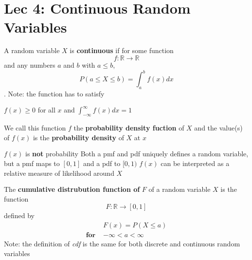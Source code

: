 \documentclass{article}
\begin{document}
\section{Lec 4: Continuous Random Variables}
\begin{definition}
A random variable $X$ is \textbf{continuous} if for some function
$$f: \mathbb{R} \to \mathbb{R}$$
and any numbers $a$ and $b$ with $a\leq b$,
$$P(a\leq X \leq b) = \int^b_a f(x) dx$$.
Note: the function has to satisfy
\begin{outline}[enumerate]
\1 $f(x) \geq 0$ for all $x$ and
\1 $\int^\infty_{-\infty} f(x)dx = 1$
\end{outline}
We call this function $f$ the \textbf{probability density fuction} of $X$ and the value(s) of $f(x)$ is the \textbf{probability density} of $X$ at $x$
\end{definition}
\begin{outline}[enumerate]
\1 $f(x)$ is \textbf{not} probability
\1 Both a pmf and pdf uniquely defines a random variable, but a pmf maps to $[0,1]$ and a pdf to $[0,1)$
\1 $f(x)$ can be interpreted as a relative measure of likelihood around $X$
\end{outline}
\begin{definition}
The \textbf{cumulative distrubution function of} $F$ of a random variable $X$ is the function
$$F: \mathbb{R} \to [0,1]$$
defined by
\begin{align*}
&F(x) = P(X\leq a)\\
\textbf{for } &-\infty < a < \infty
\end{align*}
Note: the definition of \emph{cdf} is the same for both discrete and continuous random variables	
\end{definition}
\end{document}
